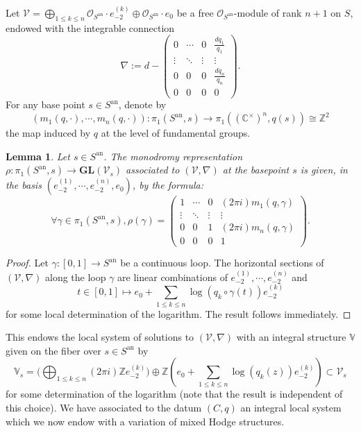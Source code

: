 \documentclass[10pt]{article}
\numberwithin{equation}{subsection}
\theoremstyle{plain}
\newtheorem{lemma}[theorem]{Lemma}
\theoremstyle{definition}
\theoremstyle{remark}
\newcommand{\Z}{\mathbb Z}
\newcommand{\C}{\mathbb C}
\newcommand{\V}{\mathbb V}
\newcommand{\an}{\mathrm{an}}
\newcommand{\gl}{\mathbf{GL}}
\begin{document}
Let $\mathcal{V} = \bigoplus_{1 \leqslant k \leqslant n} \mathcal{O}_{S^\an} \cdot e_{-2}^{(k)} \oplus \mathcal{O}_{S^\an}\cdot e_0$ be a free $\mathcal{O}_{S^\an}$-module of rank $n+1$ on $S$, endowed with the integrable connection
\[
\nabla := d -  \left(\begin{array}{cccc}0  &  \cdots & 0 & \frac{d q_1}{q_1}  \\ \vdots & \ddots & \vdots & \vdots \\0 & 0 & 0 & \frac{d q_n}{q_n}  \\0 & 0 & 0 & 0\end{array}\right).
\]
For any base point $s \in S^\an$, denote by \[(m_1(q,\cdot), \cdots,  m_n(q,\cdot)) : \pi_1(S^\an,s) \rightarrow \pi_1((\C^\times)^n, q(s)) \cong \Z^2\] the map induced by $q$ at the level of fundamental groups.
\begin{lemma}\label{monoint}
Let $s \in S^\an$. The monodromy representation $\rho : \pi_1(S^\an,s) \rightarrow \gl(\mathcal{V}_s)$ associated to $(\mathcal{V}, \nabla)$ at the basepoint $s$ is given, in the basis $(e_{-2}^{(1)}, \cdots, e_{-2}^{(n)}, e_0)$, by the formula:
\[
\forall \gamma \in \pi_1(S^\an,s), \rho(\gamma) = \left(\begin{array}{cccc}1  &  \cdots & 0 & (2\pi i)m_1(q,\gamma)  \\ \vdots & \ddots & \vdots & \vdots \\0 & 0 & 1 & (2\pi i)m_n(q, \gamma)  \\0 & 0 & 0 & 1\end{array}\right).
\]
\end{lemma}
\begin{proof}
Let $\gamma : [0,1] \rightarrow S^\an$ be a continuous loop. The horizontal sections of $(\mathcal{V}, \nabla)$ along the loop $\gamma$ are linear combinations of $e_{-2}^{(1)}, \cdots,  e_{-2}^{(n)}$ and
\[
t \in [0,1] \mapsto  e_0 + \sum_{1 \leqslant k \leqslant n} \log(q_k \circ \gamma(t)) e_{-2}^{(k)}
\]
for some local determination of the logarithm. The result follows immediately.
\end{proof}
This endows the local system of solutions to $(\mathcal{V}, \nabla)$ with an integral structure $\V$ given on the fiber over $s \in S^\an$ by
\[ \V_s = \Big(\bigoplus_{1 \leqslant k \leqslant n} (2 \pi i) \Z e_{-2}^{(k)}\Big) \oplus \Z (e_0 + \sum_{1 \leqslant k \leqslant n} \log(q_k(z)) e_{-2}^{(k)}) \subset \mathcal{V}_s\]
for some determination of the logarithm (note that the result is independent of this choice). We have associated to the datum $(C,q)$ an integral local system which we now endow with a variation of mixed Hodge structures.
\end{document}
